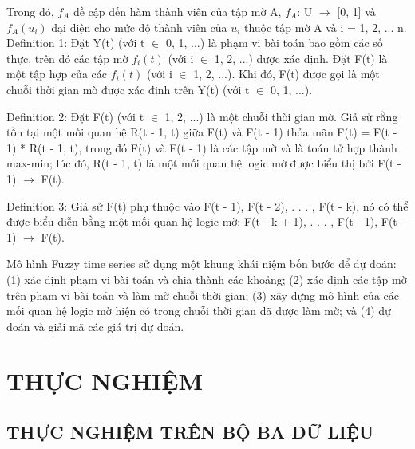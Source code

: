 \documentclass[conference]{IEEEtran}
\begin{document}
Trong đó, $f_A$ đề cập đến hàm thành viên của tập mờ A, $f_A$: U $\to$ [0, 1] và $f_A(u_i)$ đại diện cho mức độ thành viên của $u_i$ thuộc tập mờ A và i = 1, 2, ... n.
Definition 1: Đặt Y(t) (với t $\in$ 0, 1, ...) là phạm vi bài toán bao gồm các số thực, trên đó các tập mờ $f_i(t)$ (với i $\in$ 1, 2, ...) được xác định. Đặt F(t) là một tập hợp của các $f_i(t)$ (với i $\in$ 1, 2, ...). Khi đó, F(t) được gọi là một chuỗi thời gian mờ được xác định trên Y(t) (với t $\in$ 0, 1, ...).

Definition 2: Đặt F(t) (với t $\in$ 1, 2, ...) là một chuỗi thời gian mờ. Giả sử rằng tồn tại một mối quan hệ R(t - 1, t) giữa F(t) và F(t - 1) thỏa mãn F(t) = F(t - 1) * R(t - 1, t), trong đó F(t) và F(t - 1) là các tập mờ và là toán tử hợp thành max-min; lúc đó, R(t - 1, t) là một mối quan hệ logic mờ được biểu thị bởi F(t - 1) $\to$ F(t).

Definition 3: Giả sử F(t) phụ thuộc vào F(t - 1), F(t - 2), . . . , F(t - k), nó có thể được biểu diễn bằng một mối quan hệ logic mờ: F(t - k + 1), . . . , F(t - 1), F(t - 1) $\to$ F(t).

Mô hình Fuzzy time series sử dụng một khung khái niệm bốn bước để dự đoán: (1) xác định phạm vi bài toán và chia thành các khoảng; (2) xác định các tập mờ trên phạm vi bài toán và làm mờ chuỗi thời gian; (3) xây dựng mô hình của các mối quan hệ logic mờ hiện có trong chuỗi thời gian đã được làm mờ; và (4) dự đoán và giải mã các giá trị dự đoán.
\section{THỰC NGHIỆM}
\subsection{THỰC NGHIỆM TRÊN BỘ BA DỮ LIỆU}
\end{document}
